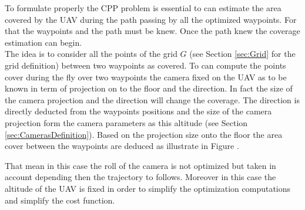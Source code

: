 To formulate properly the CPP problem is essential to can estimate the area covered by the UAV during the path passing by all the optimized waypoints. For that the waypoints and the path must be knew. 
 Once the path knew the coverage estimation can begin. \\
 The idea is to consider all the points of the grid $G$ (see Section \ref{sec:Grid} for the grid definition) between two waypoints as covered. To can compute the points cover during the fly over two waypoints the camera fixed on the UAV as to be known in term of projection on to the floor and the direction. In fact the size of the camera projection and the direction will change the coverage. The direction is directly deducted from the waypoints positions and the size of the camera projection form the camera parameters as this altitude (see Section \ref{sec:CamerasDefinition}). Based on the projection size onto the floor the area cover between the waypoints are deduced as illustrate in Figure .

 
 That mean in this case the roll of the camera is not optimized but taken in account depending then the trajectory to follows. Moreover in this case the altitude of the UAV is fixed in order to simplify the optimization computations and simplify the cost function.

